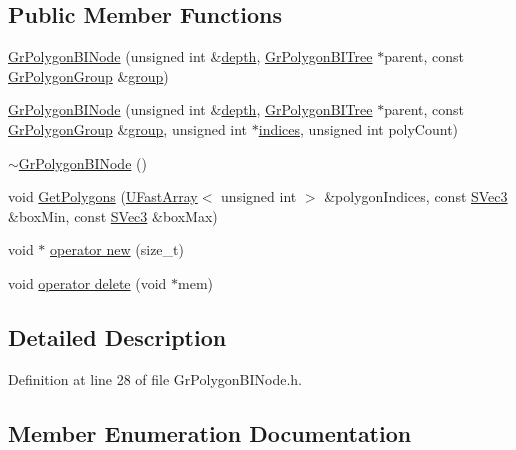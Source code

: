 \begin{CompactItemize}
\subsection*{Public Member Functions}
\begin{CompactItemize}
\item 
\hyperlink{class_gr_polygon_b_i_node_2b0d0ba71be948dc3a83f588bc0996ab}{GrPolygonBINode} (unsigned int \&\hyperlink{glext__bak_8h_1c814629538debe12a7bfe2509a3671e}{depth}, \hyperlink{class_gr_polygon_b_i_tree}{GrPolygonBITree} $\ast$parent, const \hyperlink{class_gr_polygon_group}{GrPolygonGroup} \&\hyperlink{wglext_8h_69cec9b28d037f2272131b4fcd148620}{group})
\item 
\hyperlink{class_gr_polygon_b_i_node_0db4a41472906e2b89df7d278b5bd25c}{GrPolygonBINode} (unsigned int \&\hyperlink{glext__bak_8h_1c814629538debe12a7bfe2509a3671e}{depth}, \hyperlink{class_gr_polygon_b_i_tree}{GrPolygonBITree} $\ast$parent, const \hyperlink{class_gr_polygon_group}{GrPolygonGroup} \&\hyperlink{wglext_8h_69cec9b28d037f2272131b4fcd148620}{group}, unsigned int $\ast$\hyperlink{glext__bak_8h_c4293d0f76770fe857be3431df25308d}{indices}, unsigned int polyCount)
\item 
\hyperlink{class_gr_polygon_b_i_node_18ea1e3d6112a3aa526d399b6abe3ba5}{$\sim$GrPolygonBINode} ()
\item 
void \hyperlink{class_gr_polygon_b_i_node_c85fa5cabd12d49fd10362ec7896a129}{GetPolygons} (\hyperlink{class_u_fast_array}{UFastArray}$<$ unsigned int $>$ \&polygonIndices, const \hyperlink{struct_s_vec3}{SVec3} \&boxMin, const \hyperlink{struct_s_vec3}{SVec3} \&boxMax)
\item 
void $\ast$ \hyperlink{class_gr_polygon_b_i_node_b27187f2d02d3fe410427168c836f3de}{operator new} (size\_\-t)
\item 
void \hyperlink{class_gr_polygon_b_i_node_52c6bb5186eba8c6ef16dbb3a3eafd82}{operator delete} (void $\ast$mem)
\end{CompactItemize}


\subsection{Detailed Description}


Definition at line 28 of file GrPolygonBINode.h.

\subsection{Member Enumeration Documentation}
\hypertarget{class_gr_polygon_b_i_node_3647d87a0c6d714a653119379817a057}{
}
\end{CompactItemize}
